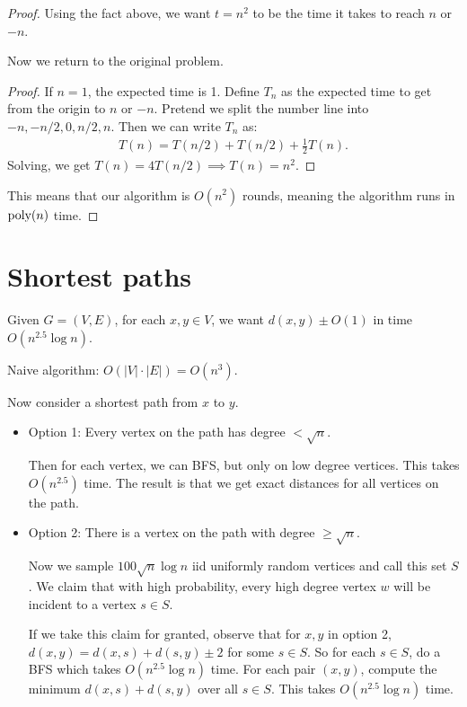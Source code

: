 \documentclass{report}
\begin{document}
\begin{proof}
Using the fact above, we want $t=n^2$ to be the time it takes to reach $n$ or $-n$. 

Now we return to the original problem. 

\begin{proof}
    If $n=1$, the expected time is 1. Define $T_n$ as the expected time to get from the origin to $n$ or $-n$. Pretend we split the number line into $-n, -n/2, 0, n/2, n$. Then we can write $T_n$ as:
    \begin{align*}
        T(n) = T(n/2) + T(n/2) + \frac 12 T(n).
    \end{align*}
    Solving, we get $T(n) = 4T(n/2) \implies T(n) = n^2$.
\end{proof}

This means that our algorithm is $O(n^2)$ rounds, meaning the algorithm runs in $\text{poly}(n)$ time.
\end{proof}

\section{Shortest paths}
Given $G = (V,E)$, for each $x, y \in V$, we want $d(x, y) \pm O(1)$ in time $O(n^{2.5} \log n)$.

Naive algorithm: $O(|V| \cdot |E|) = O(n^3)$. 

Now consider a shortest path from $x$ to $y$.
\begin{itemize}
    \item Option 1: Every vertex on the path has degree $< \sqrt n$. 
    
    Then for each vertex, we can BFS, but only on low degree vertices. This takes $O(n^{2.5})$ time. The result is that we get exact distances for all vertices on the path.
    \item Option 2: There is a vertex on the path with degree $\geq \sqrt n$.
    
    Now we sample $100\sqrt n \log n$ iid uniformly random vertices and call this set $S$. We claim that with high probability, every high degree vertex $w$ will be incident to a vertex $s \in S$. 

    If we take this claim for granted, observe that for $x,y$ in option 2, $d(x, y) = d(x, s) + d(s, y) \pm 2$ for some $s \in S$. So for each $s \in S$, do a BFS which takes $O(n^{2.5} \log n)$ time. For each pair $(x, y)$, compute the minimum $d(x, s) + d(s, y)$ over all $s \in S$. This takes $O(n^{2.5} \log n)$ time.
\end{itemize}
\end{document}
